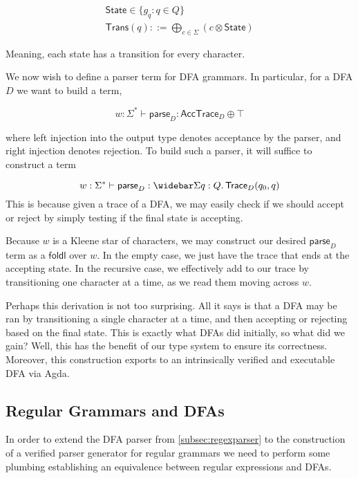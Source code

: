 \documentclass[acmsmall,screen,nonacm]{acmart}
\makeatletter
\newcommand{\String}{\Sigma^{*}}
\newcommand{\LinSigTy}[3]{\widebar\Sigma #1 : #2.\, #3}
\newif\ifdraft
\newcommand{\todoin}[1]{\ifdraft{\todo[inline]{TODO:\@ #1}}\fi}
\makeatother
\begin{document}
\begin{gather*}
 \mathsf{State} \in \{ g_{q} : q \in Q \} \\
 \mathsf{Trans}(q) ::= \bigoplus_{c \in \Sigma} (c \otimes \mathsf{State})
\end{gather*}

Meaning, each state has a transition for every character.

We now wish to define a parser term for DFA grammars. In
particular, for a DFA $D$ we want to build a term,

\[
  w : \String \vdash \mathsf{parse}_{D} : \mathsf{AccTrace}_{D} \oplus \top
\]

where left injection into the output type denotes acceptance
by the parser, and right injection denotes rejection. To
build such a parser, it will suffice to construct a term

\[
  w : \String \vdash \mathsf{parse}_{D} : \LinSigTy q Q {\mathsf{Trace}_{D}(q_{0} , q)}
\]
This is because given a trace of a DFA, we may easily check
if we should accept or reject by simply testing
if the final state is accepting.

Because $w$ is a Kleene star of characters, we may construct
our desired $\mathsf{parse}_{D}$ term as a $\mathsf{foldl}$
over $w$. In the empty case, we just have the trace that
ends at the accepting state. In the recursive case, we
effectively add to our trace by transitioning one character
at a time, as we read them moving across $w$.

\todoin{Derivation tree for this construction}

Perhaps this derivation is not too surprising. All it says
is that a DFA may be ran by transitioning a single character
at a time, and then accepting or rejecting based on the
final state. This is exactly what DFAs did initially, so
what did we gain? Well, this has the benefit of our type
system to ensure its correctness. Moreover, this construction exports to an
intrinsically verified and executable DFA via Agda.


\subsection{Regular Grammars and DFAs}
\label{subsec:deriv}

In order to extend the DFA
parser from \cref{subsec:regexparser} to the construction of
a verified parser
generator for regular grammars we need to perform some
plumbing establishing an equivalence between regular
expressions and DFAs.
\end{document}
